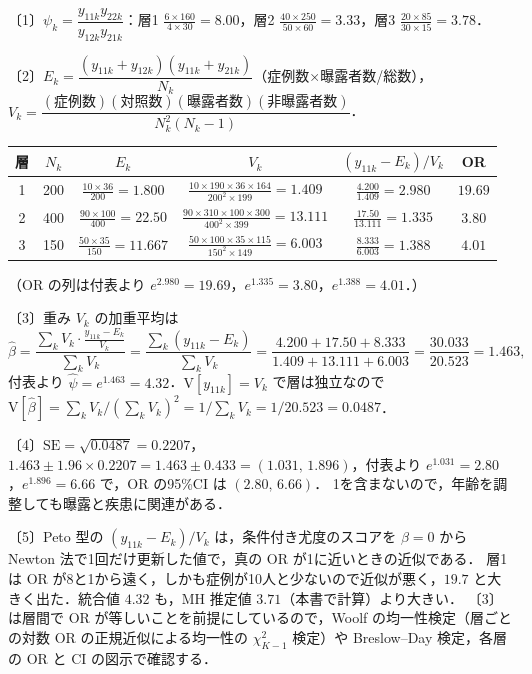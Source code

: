 \documentclass[a4paper,11pt,openany]{ltjsbook}
\newenvironment{kaitou}[1]{%
  \par\medskip\noindent
  \begin{tcolorbox}[enhanced,breakable,colback=bkgray!3,colframe=bkgray!60,boxrule=0.4pt,
    left=4pt,right=4pt,top=2pt,bottom=2pt,arc=1pt,
    title={\cref{#1}の解答},fonttitle=\bfseries\small,coltitle=white,colbacktitle=bkgray!80]}%
  {\end{tcolorbox}\par}
\newcommand{\V}{\mathrm{V}}
\newcommand{\SE}{\mathrm{SE}}
\begin{document}
\begin{kaitou}{reidai:m07-2}
〔1〕$\psi_k=\dfrac{y_{11k}y_{22k}}{y_{12k}y_{21k}}$：層1 $\frac{6\times160}{4\times30}=8.00$，層2 $\frac{40\times250}{50\times60}=3.33$，層3 $\frac{20\times85}{30\times15}=3.78$．

〔2〕$E_k=\dfrac{(y_{11k}+y_{12k})(y_{11k}+y_{21k})}{N_k}$（症例数×曝露者数/総数），$V_k=\dfrac{(\text{症例数})(\text{対照数})(\text{曝露者数})(\text{非曝露者数})}{N_k^2(N_k-1)}$．
\begin{center}\small
\begin{tabular}{@{}cccccc@{}}
\toprule
層 & $N_k$ & $E_k$ & $V_k$ & $(y_{11k}-E_k)/V_k$ & OR\\
\midrule
1 & 200 & $\frac{10\times36}{200}=1.800$ & $\frac{10\times190\times36\times164}{200^2\times199}=1.409$ & $\frac{4.200}{1.409}=2.980$ & $19.69$\\
2 & 400 & $\frac{90\times100}{400}=22.50$ & $\frac{90\times310\times100\times300}{400^2\times399}=13.111$ & $\frac{17.50}{13.111}=1.335$ & $3.80$\\
3 & 150 & $\frac{50\times35}{150}=11.667$ & $\frac{50\times100\times35\times115}{150^2\times149}=6.003$ & $\frac{8.333}{6.003}=1.388$ & $4.01$\\
\bottomrule
\end{tabular}
\end{center}
（OR の列は付表より $e^{2.980}=19.69$，$e^{1.335}=3.80$，$e^{1.388}=4.01$．）

〔3〕重み $V_k$ の加重平均は
\[
\hat\beta=\frac{\sum_kV_k\cdot\frac{y_{11k}-E_k}{V_k}}{\sum_kV_k}=\frac{\sum_k(y_{11k}-E_k)}{\sum_kV_k}=\frac{4.200+17.50+8.333}{1.409+13.111+6.003}=\frac{30.033}{20.523}=1.463,
\]
付表より $\hat\psi=e^{1.463}=4.32$．$\V[y_{11k}]=V_k$ で層は独立なので $\V[\hat\beta]=\sum_kV_k/(\sum_kV_k)^2=1/\sum_kV_k=1/20.523=0.0487$．

〔4〕$\SE=\sqrt{0.0487}=0.2207$，$1.463\pm1.96\times0.2207=1.463\pm0.433=(1.031,\,1.896)$，付表より $e^{1.031}=2.80$，$e^{1.896}=6.66$ で，OR の95\%CI は $(2.80,\,6.66)$．
1を含まないので，年齢を調整しても曝露と疾患に関連がある．

〔5〕Peto 型の $(y_{11k}-E_k)/V_k$ は，条件付き尤度のスコアを $\beta=0$ から Newton 法で1回だけ更新した値で，真の OR が1に近いときの近似である．
層1は OR が8と1から遠く，しかも症例が10人と少ないので近似が悪く，$19.7$ と大きく出た．統合値 $4.32$ も，MH 推定値 $3.71$（本書で計算）より大きい．
〔3〕は層間で OR が等しいことを前提にしているので，Woolf の均一性検定（層ごとの対数 OR の正規近似による均一性の $\chi^2_{K-1}$ 検定）や Breslow--Day 検定，各層の OR と CI の図示で確認する．
\end{kaitou}
\end{document}
